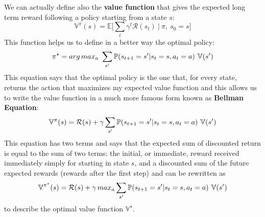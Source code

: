 We can actually define also the \textbf{value function} that gives the expected long term reward following a policy starting from a state $s$:
\begin{equation}
    \mathbb{V}^\pi(s) = \mathbb{E} \Big[ \sum_t \gamma^t \mathcal{R}(s_t) \ \vert \ \pi, \ s_0 = s \Big]
\end{equation}
This function helps us to define in a better way the optimal policy:
\begin{equation} \label{eq:bellman-value}
    \pi^\star = arg\,max_a \ \sum_{s'} \mathbb{P}(s_{t+1} = \mathnormal{s'} \vert s_t = \mathnormal{s}, a_t = \mathnormal{a}) \ \mathbb{V}(s')
\end{equation}
This equation says that the optimal policy is the one that, for every state, returns the action that maximizes my expected value function and this allows us to write the value function in a much more famous form known as \textbf{Bellman Equation}:
\begin{equation}
    \mathbb{V}^\pi(s) = \mathcal{R}(s) +  \gamma\sum_{s'} \mathbb{P}(s_{t+1} = \mathnormal{s'} \vert s_t = \mathnormal{s}, a_t = \mathnormal{a}) \ \mathbb{V}(s')
\end{equation}
This equation has two terms and says that the expected sum of discounted return is equal to the sum of two terms: the initial, or immediate, reward received immediately simply for starting in state $s$, and a discounted sum of the future expected rewards (rewards after the first step) and can be rewritten as \begin{equation}
    \mathbb{V}^{\pi^\star}(s) = \mathcal{R}(s) +  \gamma\,max_a\sum_{s'} \mathbb{P}(s_{t+1} = \mathnormal{s'} \vert s_t = \mathnormal{s}, a_t = \mathnormal{a}) \ \mathbb{V}(s')
\end{equation}
to describe the optimal value function $\mathbb{V}^\star$.

